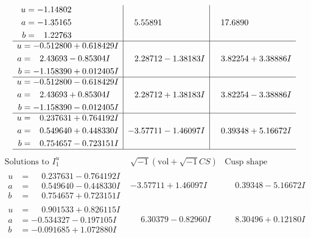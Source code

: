 \documentclass[1p]{elsarticle_modified}
\theoremstyle{definition}
\newcommand{\I}{\sqrt{-1}}
\begin{document}
$$\begin{array}{c|c|c}
\begin{aligned}
u &= -1.14802\phantom{ +0.000000I} \\
a &= -1.35165\phantom{ +0.000000I} \\
b &= \phantom{-}1.22763\phantom{ +0.000000I}\end{aligned}
 & \phantom{-}5.55891\phantom{ +0.000000I} & \phantom{-}17.6890\phantom{ +0.000000I} \\ \hline\begin{aligned}
u &= -0.512800 + 0.618429 I \\
a &= \phantom{-}2.43693 - 0.85304 I \\
b &= -1.158390 + 0.012405 I\end{aligned}
 & \phantom{-}2.28712 - 1.38183 I & \phantom{-}3.82254 + 3.38886 I \\ \hline\begin{aligned}
u &= -0.512800 - 0.618429 I \\
a &= \phantom{-}2.43693 + 0.85304 I \\
b &= -1.158390 - 0.012405 I\end{aligned}
 & \phantom{-}2.28712 + 1.38183 I & \phantom{-}3.82254 - 3.38886 I \\ \hline\begin{aligned}
u &= \phantom{-}0.237631 + 0.764192 I \\
a &= \phantom{-}0.549640 + 0.448330 I \\
b &= \phantom{-}0.754657 - 0.723151 I\end{aligned}
 & -3.57711 - 1.46097 I & \phantom{-}0.39348 + 5.16672 I\\
 \hline 
 \end{array}$$\newpage$$\begin{array}{c|c|c}  
\text{Solutions to }I^u_{1}& \I (\text{vol} + \sqrt{-1}CS) & \text{Cusp shape}\\
 \hline 
\begin{aligned}
u &= \phantom{-}0.237631 - 0.764192 I \\
a &= \phantom{-}0.549640 - 0.448330 I \\
b &= \phantom{-}0.754657 + 0.723151 I\end{aligned}
 & -3.57711 + 1.46097 I & \phantom{-}0.39348 - 5.16672 I \\ \hline\begin{aligned}
u &= \phantom{-}0.901533 + 0.826115 I \\
a &= -0.534327 - 0.197105 I \\
b &= -0.091685 + 1.072880 I\end{aligned}
 & \phantom{-}6.30379 - 0.82960 I & \phantom{-}8.30496 + 0.12180 I \\ \hline\begin{aligned}

\end{aligned}
\end{array}$$
\end{document}
